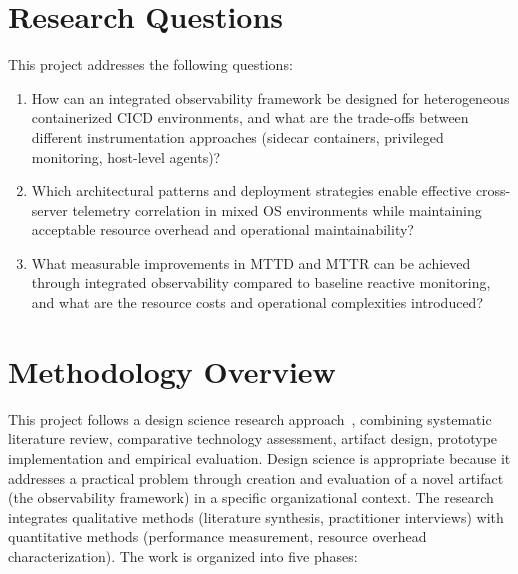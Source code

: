 \section{Research Questions}
This project addresses the following questions:
\begin{enumerate}
    \item\label{rq:design-tradeoffs} How can an integrated observability framework be designed for heterogeneous containerized \ac{CICD} environments, and what are the trade-offs between different instrumentation approaches (sidecar containers, privileged monitoring, host-level agents)?
    \item\label{rq:correlation-maintainability} Which architectural patterns and deployment strategies enable effective cross-server telemetry correlation in mixed OS environments while maintaining acceptable resource overhead and operational maintainability?
    \item\label{rq:mttd-mtt-baseline} What measurable improvements in \ac{MTTD} and \ac{MTTR} can be achieved through integrated observability compared to baseline reactive monitoring, and what are the resource costs and operational complexities introduced?
\end{enumerate}

\section{Methodology Overview}
This project follows a design science research approach~\cite{hevner2004design}, combining systematic literature review, comparative technology assessment, artifact design, prototype implementation and empirical evaluation. Design science is appropriate because it addresses a practical problem through creation and evaluation of a novel artifact (the observability framework) in a specific organizational context. The research integrates qualitative methods (literature synthesis, practitioner interviews) with quantitative methods (performance measurement, resource overhead characterization). The work is organized into five phases:

